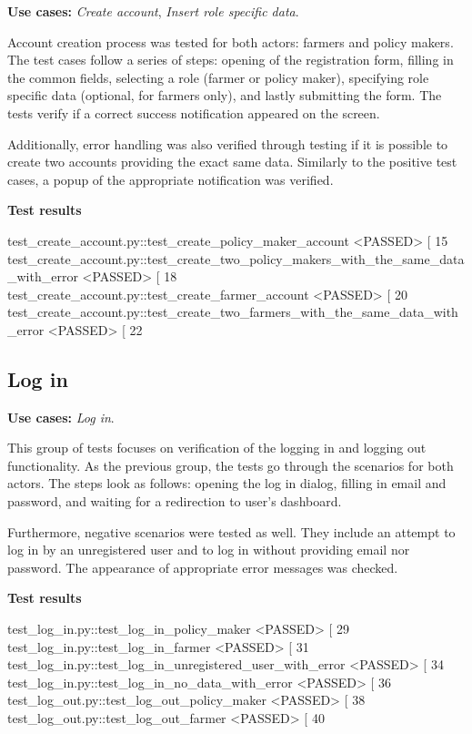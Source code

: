 \textbf{Use cases:} \textit{Create account}, \textit{Insert role specific data}.

Account creation process was tested for both actors: farmers and policy makers. The test cases follow a series of steps: opening of the registration form, filling in the common fields, selecting a role (farmer or policy maker), specifying role specific data (optional, for farmers only), and lastly submitting the form. The tests verify if a correct success notification appeared on the screen.

Additionally, error handling was also verified through testing if it is possible to create two accounts providing the exact same data. Similarly to the positive test cases, a popup of the appropriate notification was verified.

\textbf{Test results}
\begin{verbnobox}[\scriptsize \vbdelim]
test_create_account.py::test_create_policy_maker_account <PASSED>                            [ 15%
test_create_account.py::test_create_two_policy_makers_with_the_same_data_with_error <PASSED> [ 18%
test_create_account.py::test_create_farmer_account <PASSED>                                  [ 20%
test_create_account.py::test_create_two_farmers_with_the_same_data_with_error <PASSED>       [ 22%
\end{verbnobox}

\subsection{Log in}

\textbf{Use cases:} \textit{Log in}.

This group of tests focuses on verification of the logging in and logging out functionality. As the previous group, the tests go through the scenarios for both actors. The steps look as follows: opening the log in dialog, filling in email and password, and waiting for a redirection to user's dashboard.

Furthermore, negative scenarios were tested as well. They include an attempt to log in by an unregistered user and to log in without providing email nor password. The appearance of appropriate error messages was checked.

\textbf{Test results}
\begin{verbnobox}[\footnotesize \vbdelim]
test_log_in.py::test_log_in_policy_maker <PASSED>                          [ 29%
test_log_in.py::test_log_in_farmer <PASSED>                                [ 31%
test_log_in.py::test_log_in_unregistered_user_with_error <PASSED>          [ 34%
test_log_in.py::test_log_in_no_data_with_error <PASSED>                    [ 36%
test_log_out.py::test_log_out_policy_maker <PASSED>                        [ 38%
test_log_out.py::test_log_out_farmer <PASSED>                              [ 40%
\end{verbnobox}

